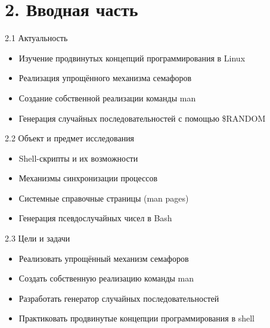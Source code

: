\documentclass[
  ignorenonframetext,
  aspectratio=169,
  russian,
]{beamer}
\providecommand{\tightlist}{%
  \setlength{\itemsep}{0pt}\setlength{\parskip}{0pt}}
\begin{document}
\section{2. Вводная
часть}\label{ux432ux432ux43eux434ux43dux430ux44f-ux447ux430ux441ux442ux44c}

\begin{frame}{2.1 Актуальность}
\label{ux430ux43aux442ux443ux430ux43bux44cux43dux43eux441ux442ux44c}
\begin{itemize}[<+->]
\tightlist
\item
  Изучение продвинутых концепций программирования в Linux
\item
  Реализация упрощённого механизма семафоров
\item
  Создание собственной реализации команды man
\item
  Генерация случайных последовательностей с помощью \$RANDOM
\end{itemize}
\end{frame}

\begin{frame}{2.2 Объект и предмет исследования}
\label{ux43eux431ux44aux435ux43aux442-ux438-ux43fux440ux435ux434ux43cux435ux442-ux438ux441ux441ux43bux435ux434ux43eux432ux430ux43dux438ux44f}
\begin{itemize}[<+->]
\tightlist
\item
  Shell-скрипты и их возможности
\item
  Механизмы синхронизации процессов
\item
  Системные справочные страницы (man pages)
\item
  Генерация псевдослучайных чисел в Bash
\end{itemize}
\end{frame}

\begin{frame}{2.3 Цели и задачи}
\label{ux446ux435ux43bux438-ux438-ux437ux430ux434ux430ux447ux438}
\begin{itemize}[<+->]
\tightlist
\item
  Реализовать упрощённый механизм семафоров
\item
  Создать собственную реализацию команды man
\item
  Разработать генератор случайных последовательностей
\item
  Практиковать продвинутые концепции программирования в shell
\end{itemize}
\end{frame}
\end{document}
